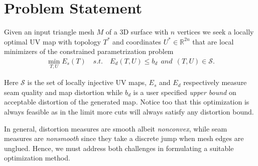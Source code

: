 
\section{Problem Statement}

Given an input triangle mesh $M$ of a 3D surface with $n$ vertices we seek a locally optimal UV map with topology $T^*$ and coordinates $U^* \in \mathbb{R}^{2n}$ that are local  minimizers of the constrained parametrization problem
\begin{align}
	\min_{T,U} E_s(T) \quad s.t. \quad E_d(T,U) \leq b_d\ \ and\ \ (T, U) \in \mathcal{S}.
	\label{eq:p1}
\end{align}
 

Here $\mathcal{S}$ is the set of locally injective UV maps, $E_s$ and $E_d$ respectively measure seam quality and map distortion while $b_d$ is a user specified \emph{upper bound} on acceptable distortion of the generated map. Notice too that this optimization is always feasible as in the limit more cuts will always satisfy any  distortion bound. %

In general, distortion measures are smooth albeit \emph{nonconvex}, while seam measures are \emph{nonsmooth} since they take a discrete jump when mesh edges are unglued.  Hence, we must address both challenges in formulating a suitable optimization method. 

